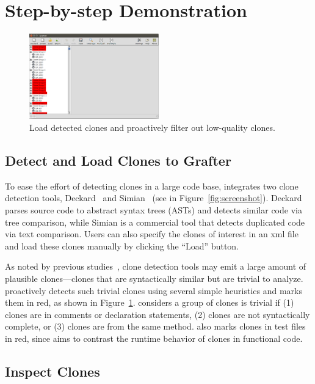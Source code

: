 \section{Step-by-step Demonstration}
\label{sec:demo}

\begin{figure}[!t]
\centering
\includegraphics[width=0.5\textwidth]{grafter_new.png}
\caption{Load detected clones and proactively filter out low-quality clones.}
\label{fig:load}
\end{figure}

\subsection{Detect and Load Clones to Grafter}

To ease the effort of detecting clones in a large code base, {\grafter} integrates two clone detection tools, Deckard~\cite{Jiang2007a} and Simian~\cite{simian} (see  in Figure~\ref{fig:screenshot}). Deckard parses source code to abstract syntax trees (ASTs) and detects similar code via tree comparison, while Simian is a commercial tool that detects duplicated code via text comparison. Users can also specify the clones of interest in an xml file and load these clones manually by clicking the ``Load'' button.

As noted by previous studies~\cite{bellon2007comparison, roy2009comparison}, clone detection tools may emit a large amount of plausible clones---clones that are syntactically similar but are trivial to analyze. {\grafter} proactively detects such trivial clones using several simple heuristics and marks them in red, as shown in Figure~\ref{fig:load}. {\grafter} considers a group of clones is trivial if (1) clones are in comments or declaration statements, (2) clones are not syntactically complete, or (3) clones are from the same method. {\grafter} also marks clones in test files in red, since {\grafter} aims to contrast the runtime behavior of clones in functional code.

\subsection{Inspect Clones}

